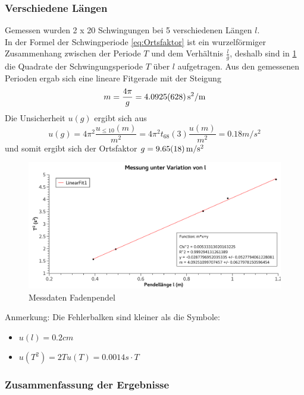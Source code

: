 \documentclass[
	a4paper,
	12pt,
	pagesize,
	ngerman
]{scrartcl}
\begin{document}
	\subsubsection{Verschiedene Längen}
	Gemessen wurden 2 x 20 Schwingungen bei 5 verschiedenen Längen $l$. \\
	In der Formel der Schwingperiode \eqref{eq:Ortsfaktor} ist ein wurzelförmiger Zusammenhang zwischen der Periode $T$ und dem Verhältnis $\frac{l}{g}$, deshalb sind in \cref{Messdaten} die Quadrate der Schwingungsperiode $T$ über $l$ aufgetragen. Aus den gemessenen Perioden ergab sich eine lineare Fitgerade mit der Steigung %
	\begin{equation*} 
		m = \frac{4\pi}{g} = \SI{4.0925 +- 0.0628 }{s^2/m}  
	\end{equation*}
	Die Unsicherheit $u(g)$ ergibt sich aus
	\begin{equation*}
		u(g) = 4\pi^2\frac{u_{\leq10}(m)}{m^2} = 4\pi^2t_{68}(3)\frac{u(m)}{m^2} = 0.18 \si{m/s^2}
	\end{equation*}
	und somit ergibt sich der Ortsfaktor  $g = \SI{9.65  +- 0.18}{m/s^2}$


	\begin{figure}[htb]
		\includegraphics[width=1\textwidth]{Graph}
		\centering
		\caption{Messdaten Fadenpendel}
		\label{Messdaten}
		\centering
	\end{figure}

	Anmerkung: Die Fehlerbalken sind kleiner als die Symbole:
	\begin{itemize}
		\item $u(l)= 0.2 \si{cm} $
		\item $u(T^2) = 2 T u(T) = 0.0014 s \cdot T $
	\end{itemize}

	\subsubsection{Zusammenfassung der Ergebnisse}
\end{document}
